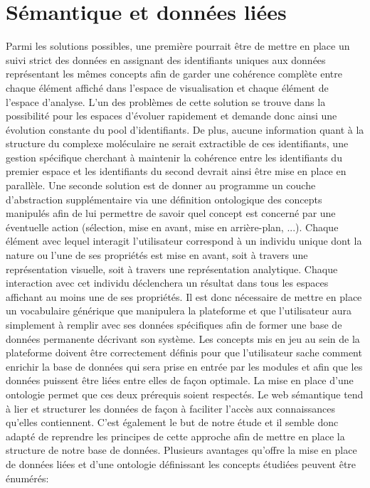 \section{Sémantique et données liées}

Parmi les solutions possibles, une première pourrait être de mettre en place un suivi strict des données en assignant des identifiants uniques aux données représentant les mêmes concepts afin de garder une cohérence complète entre chaque élément affiché dans l'espace de visualisation et chaque élément de l'espace d'analyse. L'un des problèmes de cette solution se trouve dans la possibilité pour les espaces d'évoluer rapidement et demande donc ainsi une évolution constante du pool d'identifiants. De plus, aucune information quant à la structure du complexe moléculaire ne serait extractible de ces identifiants, une gestion spécifique cherchant à maintenir la cohérence entre les identifiants du premier espace et les identifiants du second devrait ainsi être mise en place en parallèle.
Une seconde solution est de donner au programme un couche d'abstraction supplémentaire via une définition ontologique des concepts manipulés afin de lui permettre de savoir quel concept est concerné par une éventuelle action (sélection, mise en avant, mise en arrière-plan, ...). Chaque élément avec lequel interagit l'utilisateur correspond à un individu unique dont la nature ou l'une de ses propriétés est mise en avant, soit à travers une représentation visuelle, soit à travers une représentation analytique. Chaque interaction avec cet individu déclenchera un résultat dans tous les espaces affichant au moins une de ses propriétés.
Il est donc nécessaire de mettre en place un vocabulaire générique que manipulera la plateforme et que l'utilisateur aura simplement à remplir avec ses données spécifiques afin de former une base de données permanente décrivant son système. 
Les concepts mis en jeu au sein de la plateforme doivent être correctement définis pour que l'utilisateur sache comment enrichir la base de données qui sera prise en entrée par les modules et afin que les données puissent être liées entre elles de façon optimale. La mise en place d'une ontologie permet que ces deux prérequis soient respectés. Le web sémantique tend à lier et structurer les données de façon à faciliter l'accès aux connaissances qu'elles contiennent. C'est également le but de notre étude et il semble donc adapté de reprendre les principes de cette approche afin de mettre en place la structure de notre base de données. Plusieurs avantages qu'offre la mise en place de données liées et d'une ontologie définissant les concepts étudiées peuvent être énumérés:

